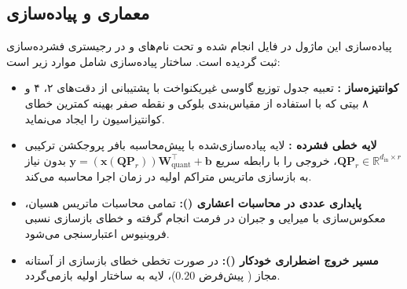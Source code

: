 \subsection{معماری و پیاده‌سازی}
پیاده‌سازی این ماژول در فایل  انجام شده و تحت نام‌های  و  در رجیستری فشرده‌سازی ثبت گردیده است. ساختار پیاده‌سازی شامل موارد زیر است:
\begin{itemize}
    \item \textbf{کوانتیزه‌ساز :} تعبیه جدول توزیع گاوسی غیریکنواخت با پشتیبانی از دقت‌های ۲، ۴ و ۸ بیتی که با استفاده از مقیاس‌بندی بلوکی و نقطه صفر بهینه کمترین خطای کوانتیزاسیون را ایجاد می‌نماید.
    \item \textbf{لایه خطی فشرده :} لایه پیاده‌سازی‌شده با پیش‌محاسبه بافر پروجکشن ترکیبی $\mathbf{Q} \mathbf{P}_r \in \mathbb{R}^{d_{\text{in}} \times r}$، خروجی را با رابطه سریع $\mathbf{y} = (\mathbf{x} (\mathbf{Q} \mathbf{P}_r)) \mathbf{W}_{\text{quant}}^\top + \mathbf{b}$ بدون نیاز به بازسازی ماتریس متراکم اولیه در زمان اجرا محاسبه می‌کند.
    \item \textbf{پایداری عددی در محاسبات اعشاری ():} تمامی محاسبات ماتریس هسیان، معکوس‌سازی با میرایی و جبران  در فرمت  انجام گرفته و خطای بازسازی نسبی فروبنیوس اعتبارسنجی می‌شود.
    \item \textbf{مسیر خروج اضطراری خودکار ():} در صورت تخطی خطای بازسازی از آستانه مجاز ( پیش‌فرض $0.20$)، لایه به ساختار اولیه بازمی‌گردد.
\end{itemize}
